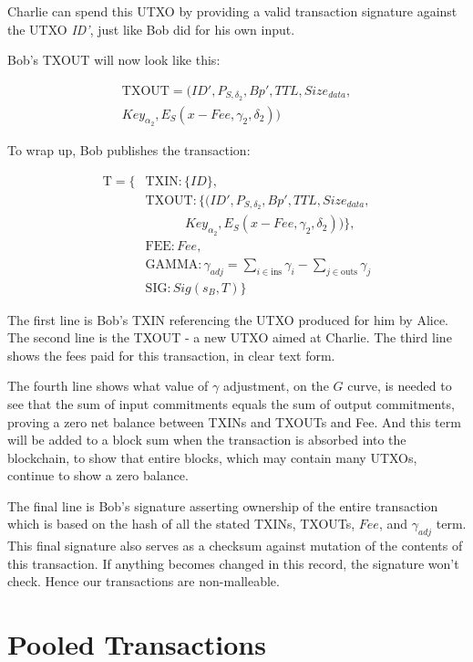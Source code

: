 \documentclass[a4paper, 10pt, conference]{ieeeconf}
\begin{document}
Charlie can spend this UTXO by providing a valid transaction signature against the UTXO \textit{ID'}, just like Bob did for his own input. 

Bob's TXOUT will now look like this:

\begin{multline*}
\text{TXOUT} = (ID', P_{S, \delta_2}, Bp', TTL, Size_{data},\\ 
                Key_{\alpha_2}, E_S(x - Fee, \gamma_2, \delta_2))
\end{multline*}

To wrap up, Bob publishes the transaction:

\begin{align*}
\text{T} = \{&\text{TXIN} : \{\mathit{ID}\}, \\
 &\text{TXOUT} : \{(ID', P_{S, \delta_2}, Bp', TTL, Size_{data}, \\
 & \ \ \ \ \ \ \ \ \ \ \ \ \ \ Key_{\alpha_2}, E_S(x - Fee, \gamma_2, \delta_2))\}, \\
 &\text{FEE} : \mathit{Fee}, \\
 &\text{GAMMA} : \gamma_{\mathit{adj}} = \sum_{i \in \text{ins}}{\gamma_i} - \sum_{j \in \text{outs}}{\gamma_j}\\
 &\text{SIG} : \mathit{Sig}(s_B, T)\}
\end{align*}

The first line is Bob's TXIN referencing the UTXO produced for him by Alice. The second line is the TXOUT - a new UTXO aimed at Charlie. The third line shows the fees paid for this transaction, in clear text form. 

The fourth line shows what value of $\gamma$ adjustment, on the $G$ curve, is needed to see that the sum of input commitments equals the sum of output commitments, proving a zero net balance between TXINs and TXOUTs and Fee. And this term will be added to a block sum when the transaction is absorbed into the blockchain, to show that entire blocks, which may contain many UTXOs, continue to show a zero balance.

The final line is Bob's signature asserting ownership of the entire transaction which is based on the hash of all the stated TXINs, TXOUTs, $Fee$, and $\gamma_{adj}$ term. This final signature also serves as a checksum against mutation of the contents of this transaction. If anything becomes changed in this record, the signature won't check. Hence our transactions are non-malleable.

\section{Pooled Transactions}\label{pooled_tx}
\end{document}
